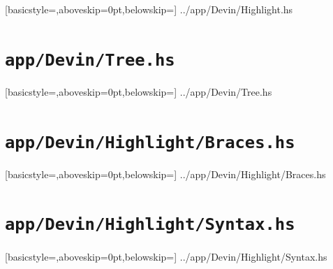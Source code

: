 \documentclass[UdineBachThesis,american,11pt]{PhdThesis}
\begin{document}
  
    [basicstyle=\ttfamily\footnotesize,aboveskip=0pt,belowskip=\baselineskip]
    {../app/Devin/Highlight.hs}

  \section{\texttt{app/Devin/Tree.hs}}

  
    [basicstyle=\ttfamily\footnotesize,aboveskip=0pt,belowskip=\baselineskip]
    {../app/Devin/Tree.hs}

  \section{\texttt{app/Devin/Highlight/Braces.hs}}

  
    [basicstyle=\ttfamily\footnotesize,aboveskip=0pt,belowskip=\baselineskip]
    {../app/Devin/Highlight/Braces.hs}

  \section{\texttt{app/Devin/Highlight/Syntax.hs}}

  
    [basicstyle=\ttfamily\footnotesize,aboveskip=0pt,belowskip=\baselineskip]
    {../app/Devin/Highlight/Syntax.hs}

  \newpage

  \thispagestyle{empty}

  \printbibliography[heading=bibintoc]
\end{document}
